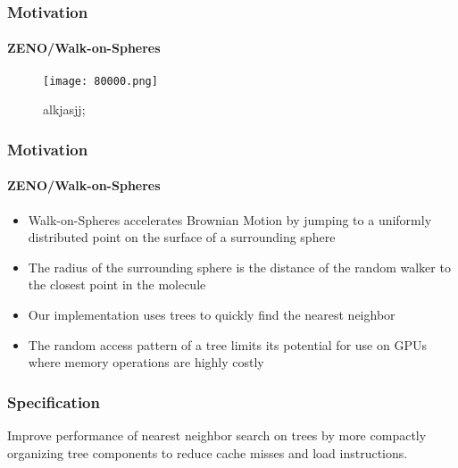 

\begin{frame}
  \frametitle{Motivation}
  \framesubtitle{ZENO/Walk-on-Spheres}

  \begin{figure}
    \centering
    \texttt{[image: 80000.png]}
    \caption{alkjasjj;}
    \label{fig:80000}
  \end{figure}

\end{frame}

\begin{frame}
  \frametitle{Motivation}
  \framesubtitle{ZENO/Walk-on-Spheres}

  \begin{itemize}
    \item Walk-on-Spheres accelerates Brownian Motion by jumping to a uniformly distributed point on the surface
      of a surrounding sphere
    \item The radius of the surrounding sphere is the distance of the random walker to the closest point in
      the molecule
    \item Our implementation uses \kd trees to quickly find the nearest neighbor
    \item The random access pattern of a \kd tree limits its potential for use on GPUs where memory operations
      are highly costly
  \end{itemize}

\end{frame}

\begin{frame}
  \frametitle{Specification}

  Improve performance of nearest neighbor search on \kd trees by more compactly organizing tree components
  to reduce cache misses and load instructions.

\end{frame}
